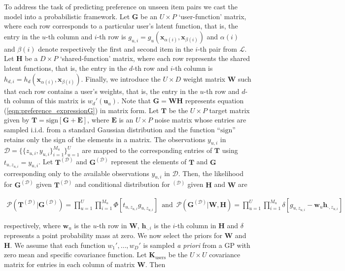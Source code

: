 To address the task of predicting preference on unseen item pairs we cast the model into a probabilistic framework. Let $\mathbf{G}$ be an $U\times P$ `user-function' matrix, where each row corresponds to a particular user's latent function, that is, the entry in the $u$-th column and $i$-th row is  $g_{u,i}= g_u(\mathbf{x}_{\alpha(i)},\mathbf{x}_{\beta(i)})$ and $\alpha(i)$ and $\beta(i)$ denote respectively the first and second item in the $i$-th pair from $\mathcal{L}$. Let $\mathbf{H}$ be a $D\times P$ `shared-function' matrix, where each row represents the shared latent functions, that is, the entry in the $d$-th row and $i$-th column is  $h_{d,i}= h_d(\mathbf{x}_{\alpha(i)},\mathbf{x}_{\beta(i)})$. Finally, we introduce the $U \times D$ weight matrix $\mathbf{W}$ such that each row contains a user's weights, that is, the entry in the $u$-th row and $d$-th column of this matrix is $w_d'(\mathbf{u}_u)$. Note that $\mathbf{G} = \mathbf{W} \mathbf{H}$ represents equation (\ref{eqn:preference_expressionG}) in matrix form. Let $\mathbf{T}$ be the $U\times P$ target matrix given by $\mathbf{T} = \text{sign}[\mathbf{G} + \mathbf{E}]$, where $\mathbf{E}$ is an $U \times P$ noise matrix whose entries are sampled i.i.d. from a standard Gaussian distribution and the function ``$\text{sign}$'' retains only the sign of the elements in a matrix.  The observations $y_{u,i}$ in $\mathcal{D}=\{\{z_{u,i},y_{u,i}\}_{i=1}^{M_u}\}_{u=1}^{U}$ are mapped to the corresponding entries of $\mathbf{T}$ using $t_{u,z_{u,i}} = y_{u,i}$. Let $\mathbf{T}^{(\mathcal{D})}$ and $\mathbf{G}^{(\mathcal{D})}$ represent the elements of $\mathbf{T}$ and $\mathbf{G}$ corresponding only to the available observations $y_{u,i}$ in $\mathcal{D}$. Then, the likelihood for $\mathbf{G}^{(\mathcal{D})}$ given $\mathbf{T}^{(\mathcal{D})}$ and conditional distribution for $\mathbf{ }^{(\mathcal{D})}$ given $\mathbf{H}$ and $\mathbf{W}$ are

\begin{align}
	\mathcal{P}(\mathbf{T}^{(\mathcal{D})}|\mathbf{G}^{(\mathcal{D})}) 
	= \prod_{u=1}^U \prod_{i=1}^{M_u} \Phi[t_{u,z_{u,i}} g_{u,z_{u,i}}]\,\,\,\text{and}\,\,\,
	\mathcal{P}(\mathbf{G}^{(\mathcal{D})}|\mathbf{W},\mathbf{H}) = 
	\prod_{u=1}^{U} \prod_{i=1}^{M_u}\delta[g_{u,z_{u,i}}-\mathbf{w}_u\mathbf{h}_{\cdot,z_{u,i}}]\,
\end{align}

respectively, where $\mathbf{w}_u$ is the $u$-th row in $\mathbf{W}$, $\mathbf{h}_{\cdot,i}$ is the $i$-th column in $\mathbf{H}$ and $\delta$ represents a point probability mass at zero. We now select the priors for $\mathbf{W}$ and $\mathbf{H}$.  We assume that each function $w_1',\ldots,w_D'$ is sampled \textit{a priori} from a GP with zero mean and specific covariance function. Let $\mathbf{K}_\text{users}$ be the $U \times U$ covariance matrix for entries in each column of matrix $\mathbf{W}$. Then

